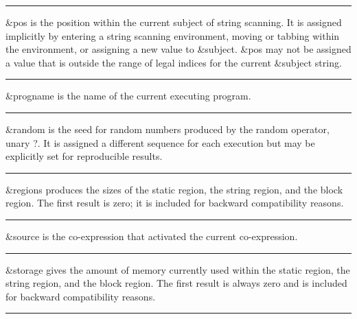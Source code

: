 \bigskip\hrule\vspace{0.1cm}

\noindent
{}\textsf{\&pos} is the position within the
current subject of string scanning. It is assigned implicitly by
entering a string scanning environment, moving or tabbing within the
environment, or assigning a new value to \textsf{\&subject}.
\textsf{\&pos} may not be assigned a value that is outside the range of
legal indices for the current \textsf{\&subject} string.

\bigskip\hrule\vspace{0.1cm}

\noindent
{}\textsf{\&progname} is the name of the current
executing program.

\bigskip\hrule\vspace{0.1cm}

\noindent
{}\textsf{\&random} is the seed for random
numbers produced by the random operator, unary \textsf{?}. It is
assigned a different sequence for each execution but may be explicitly
set for reproducible results.

\bigskip\hrule\vspace{0.1cm}

\noindent
{}\textsf{\&regions} produces the sizes of the static
region, the string region, and the block region. The first result is
zero; it is included for backward compatibility reasons.

\bigskip\hrule\vspace{0.1cm}

\noindent
\textsf{\&source} is the co-expression that activated the current
co-expression.

\bigskip\hrule\vspace{0.1cm}

\noindent
{}\textsf{\&storage} gives the amount of memory
currently used within the static region, the string region, and the
block region. The first result is always zero and is included for
backward compatibility reasons.

\bigskip\hrule\vspace{0.1cm}

